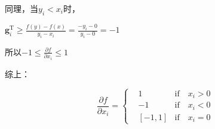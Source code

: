\documentclass[UTF8]{ctexart}
\begin{document}
同理，当$y_i < x_i$时，

$\mathbf{g}^\mathrm{T}_i \ge \frac{f(y) - f(x)}{y_i - x_i} = \frac{-y_i - 0}{y_i - 0} = -1$

所以$-1 \leq \frac{\partial f}{\partial x_i} \leq 1$

综上：

$$ \frac{\partial f}{\partial x_i} = \left\{
\begin{aligned}
&1  &\text{if} \quad  x_i > 0  \\
&-1 &\text{if} \quad  x_i < 0  \\
&\left[-1,1 \right] &\text{if} \quad  x_i = 0
\end{aligned}
\right.
$$
\end{document}
